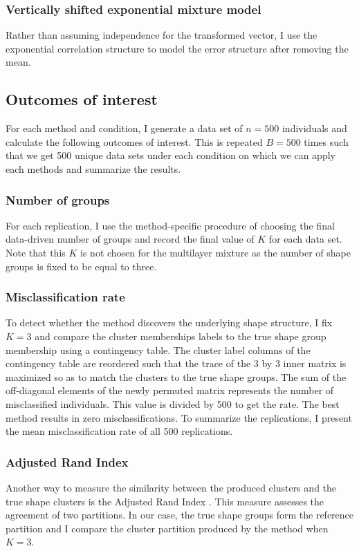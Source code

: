 \subsubsection{Vertically shifted exponential mixture model}
Rather than assuming independence for the transformed vector, I use the exponential correlation structure to model the error structure after removing the mean.

\subsection{Outcomes of interest}
For each method and condition, I generate a data set of $n=500$ individuals and calculate the following outcomes of interest. This is repeated $B=500$ times such that we get 500 unique data sets under each condition on which we can apply each methods and summarize the results.

\subsubsection{Number of groups}
For each replication, I use the method-specific procedure of choosing the final data-driven number of groups and record the final value of $K$ for each data set. Note that this $K$ is not chosen for the multilayer mixture as the number of shape groups is fixed to be equal to three.

\subsubsection{Misclassification rate}
To detect whether the method discovers the underlying shape structure, I fix $K=3$ and compare the cluster memberships labels to the true shape group membership using a contingency table. The cluster label columns of the contingency table are reordered such that the trace of the 3 by 3 inner matrix is maximized so as to match the clusters to the true shape groups. The sum of the off-diagonal elements of the newly permuted matrix represents the number of misclassified individuals. This value is divided by 500 to get the rate. The best method results in zero misclassifications. To summarize the replications, I present the mean misclassification rate of all 500 replications.

\subsubsection{Adjusted Rand Index}
Another way to measure the similarity between the produced clusters and the true shape clusters is the Adjusted Rand Index \cite{hubert1985,mulligan1985}. This measure assesses the agreement of two partitions. In our case, the true shape groups form the reference partition and I compare the cluster partition produced by the method when $K=3$.
 
